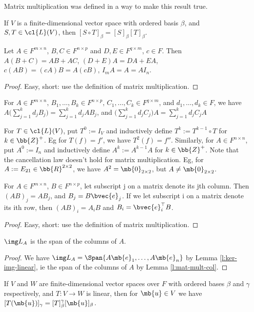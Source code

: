 Matrix multiplication was defined in a way to make this result true.
\begin{corollary}
If $V$ is a finite-dimensional vector space with ordered basis $\beta$, and $S,T \in \cl{L}(V)$, then $[S \circ T]_\beta =[S]_\beta [T]_\beta$.
\end{corollary}
\begin{lem}
Let $A \in F^{m \times n}$, $B,C \in F^{n \times p}$ and $D,E \in F^{q \times m}$, $c \in F$. Then $A(B+C)=AB+AC$, $(D+E)A=DA+EA$, $c(AB)=(cA)B=A(cB)$, $I_mA=A=AI_n$.
\end{lem}
\begin{proof}
Easy, short: use the definition of matrix multiplication.
\end{proof}
\begin{corollary}
For $A \in F^{m \times n}$, $B_1, \ldots,B_k \in F^{n \times p}$, $C_1, \ldots, C_k \in F^{q \times m}$, and $d_1, \ldots,d_k \in F$, we have $A \big( \sum_{j=1}^kd_jB_j \big)= \sum_{j=1}^kd_jAB_j$, and $\big( \sum_{j=1}^kd_jC_j \big) A= \sum_{j=1}^kd_jC_jA$
\end{corollary}
For $T \in \cl{L}(V)$, put $T^0:=I_V$ and inductively define $T^k:=T^{k-1} \circ T$ for $k \in \bb{Z}^+$. Eg for $T(f)=f'$, we have $T^2(f)=f''$. Similarly, for $A \in F^{n \times n}$, put $A^0:=I_n$ and inductively define $A^k:=A^{k-1}A$ for $k \in \bb{Z}^+$.
Note that the cancellation law doesn't hold for matrix multiplication. Eg, for $A:=E_{21}\in \bb{R}^{2 \times 2}$, we have $A^2=\mb{0}_{2 \times 2}$, but $A \neq \mb{0}_{2 \times 2}$. 
\begin{lem}\label{l:mat-mult-col}
For $A \in F^{m \times n}$, $B \in F^{n \times p}$, let subscript j on a matrix denote its jth column. Then $(AB)_j=AB_j$, and $B_j=B \bvec{e}_j$.
If we let subscript i on a matrix denote its ith row, then $(AB)_i=A_iB$ and $B_i= \bvec{e}_i^\top B$.
\end{lem}
\begin{proof}
Easy, short: use the definition of matrix multiplication.
\end{proof}
\begin{exer}\label{e:col-space}
$\img L_A$ is the span of the columns of $A$.
\end{exer}
\begin{proof}
We have $\img L_A= \Span \{ A \mb{e}_1, \ldots,A \mb{e}_n \}$ by Lemma \ref{l:ker-img-linear}, ie the span of the columns of $A$ by Lemma \ref{l:mat-mult-col}.
\end{proof}
\begin{prop}\label{p:transform-coordinate-vector}
If $V$ and $W$ are finite-dimensional vector spaces over $F$ with ordered bases $\beta$ and $\gamma$ respectively, and $T:V \to W$ is linear, then for $\mb{u}\in V$ we have $[T( \mb{u})]_\gamma =[T]_\beta^\gamma [ \mb{u}]_\beta$.
\end{prop}
